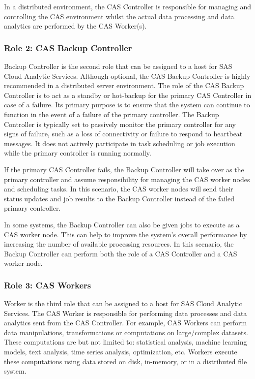 In a distributed environment, the CAS Controller is responsible for managing and controlling the CAS environment whilst the actual data processing and data analytics are performed by the CAS Worker(s).

\subsubsection{Role 2: CAS Backup Controller}
Backup Controller is the second role that can be assigned to a host for SAS Cloud Analytic Services. Although optional, the CAS Backup Controller is highly recommended in a distributed server environment. The role of the CAS Backup Controller is to act as a standby or hot-backup for the primary CAS Controller in case of a failure. Its primary purpose is to ensure that the system can continue to function in the event of a failure of the primary controller. The Backup Controller is typically set to passively monitor the primary controller for any signs of failure, such as a loss of connectivity or failure to respond to heartbeat messages. It does not actively participate in task scheduling or job execution while the primary controller is running normally. 

If the primary CAS Controller fails, the Backup Controller will take over as the primary controller and assume responsibility for managing the CAS worker nodes and scheduling tasks. In this scenario, the CAS worker nodes will send their status updates and job results to the Backup Controller instead of the failed primary controller.

In some systems, the Backup Controller can also be given jobs to execute as a CAS worker node. This can help to improve the system's overall performance by increasing the number of available processing resources. In this scenario, the Backup Controller can perform both the role of a CAS Controller and a CAS worker node.

\subsubsection{Role 3: CAS Workers}
Worker is the third role that can be assigned to a host for SAS Cloud Analytic Services. The CAS Worker is responsible for performing data processes and data analytics sent from the CAS Controller. For example, CAS Workers can perform data manipulations, transformations or computations on large/complex datasets. These computations are but not limited to: statistical analysis, machine learning models, text analysis, time series analysis, optimization, etc. Workers execute these computations using data stored on disk, in-memory, or in a distributed file system. 

